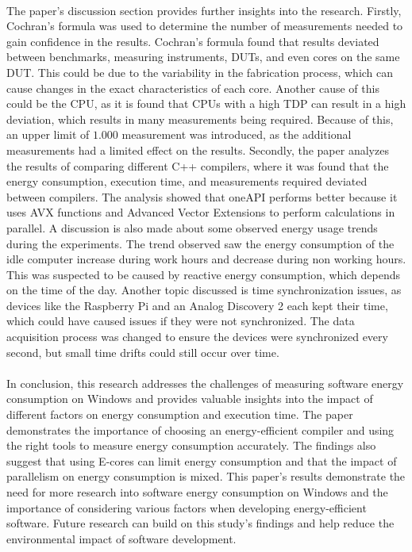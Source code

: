 \paragraph*{}
The paper's discussion section provides further insights into the research. Firstly, Cochran's formula was used to determine the number of measurements needed to gain confidence in the results. Cochran's formula found that results deviated between benchmarks, measuring instruments, DUTs, and even cores on the same DUT. This could be due to the variability in the fabrication process, which can cause changes in the exact characteristics of each core. Another cause of this could be the CPU, as it is found that CPUs with a high TDP can result in a high deviation, which results in many measurements being required. Because of this, an upper limit of $1.000$ measurement was introduced, as the additional measurements had a limited effect on the results. Secondly, the paper analyzes the results of comparing different C++ compilers, where it was found that the energy consumption, execution time, and measurements required deviated between compilers. The analysis showed that oneAPI performs better because it uses AVX functions and Advanced Vector Extensions to perform calculations in parallel. A discussion is also made about some observed energy usage trends during the experiments. The trend observed saw the energy consumption of the idle computer increase during work hours and decrease during non working hours. This was suspected to be caused by reactive energy consumption, which depends on the time of the day. Another topic discussed is time synchronization issues, as devices like the Raspberry Pi and an Analog Discovery 2 each kept their time, which could have caused issues if they were not synchronized. The data acquisition process was changed to ensure the devices were synchronized every second, but small time drifts could still occur over time.

\paragraph*{}
In conclusion, this research addresses the challenges of measuring software energy consumption on Windows and provides valuable insights into the impact of different factors on energy consumption and execution time. The paper demonstrates the importance of choosing an energy-efficient compiler and using the right tools to measure energy consumption accurately. The findings also suggest that using E-cores can limit energy consumption and that the impact of parallelism on energy consumption is mixed. This paper's results demonstrate the need for more research into software energy consumption on Windows and the importance of considering various factors when developing energy-efficient software. Future research can build on this study's findings and help reduce the environmental impact of software development. 

